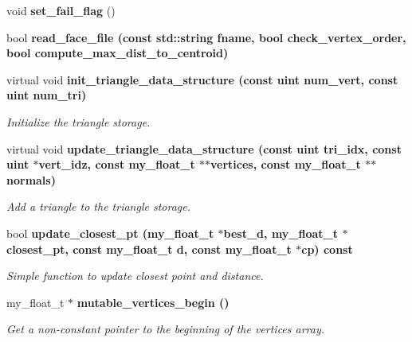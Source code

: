 \begin{CompactItemize}
\item 
void \textbf{set\_\-fail\_\-flag} ()\label{classSimSite3D_1_1geometry_1_1SimpleTrimeshTwo_34482bae5d76b139413cbb0c4dccf896}

\item 
bool \bf{read\_\-face\_\-file} (const std::string fname, bool check\_\-vertex\_\-order, bool compute\_\-max\_\-dist\_\-to\_\-centroid)
\item 
virtual void \bf{init\_\-triangle\_\-data\_\-structure} (const uint num\_\-vert, const uint num\_\-tri)\label{classSimSite3D_1_1geometry_1_1SimpleTrimeshTwo_15e4bc317ef6f01d9d59798708dd0a9a}

\begin{CompactList}\small\item\em Initialize the triangle storage. \item\end{CompactList}\item 
virtual void \bf{update\_\-triangle\_\-data\_\-structure} (const uint tri\_\-idx, const uint $\ast$vert\_\-idz, const my\_\-float\_\-t $\ast$$\ast$vertices, const my\_\-float\_\-t $\ast$$\ast$normals)\label{classSimSite3D_1_1geometry_1_1SimpleTrimeshTwo_1e6fafae2016945f5e855765a456e1fd}

\begin{CompactList}\small\item\em Add a triangle to the triangle storage. \item\end{CompactList}\item 
bool \bf{update\_\-closest\_\-pt} (my\_\-float\_\-t $\ast$best\_\-d, my\_\-float\_\-t $\ast$closest\_\-pt, const my\_\-float\_\-t d, const my\_\-float\_\-t $\ast$cp) const 
\begin{CompactList}\small\item\em Simple function to update closest point and distance. \item\end{CompactList}\item 
my\_\-float\_\-t $\ast$ \bf{mutable\_\-vertices\_\-begin} ()
\begin{CompactList}\small\item\em Get a non-constant pointer to the beginning of the vertices array. \item\end{CompactList}\end{CompactItemize}
